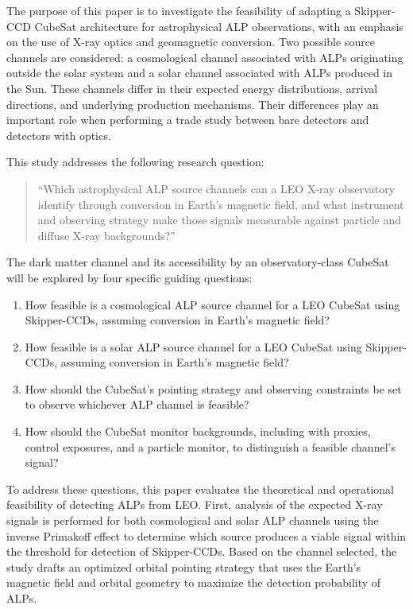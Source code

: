 \documentclass[10pt,letterpaper,twocolumn]{article}
\begin{document}
The purpose of this paper is to investigate the feasibility of adapting a Skipper-CCD CubeSat architecture for astrophysical ALP observations, with an emphasis on the use of X-ray optics and geomagnetic conversion. Two possible source channels are considered: a cosmological channel associated with ALPs originating outside the solar system and a solar channel associated with ALPs produced in the Sun. These channels differ in their expected energy distributions, arrival directions, and underlying production mechanisms. Their differences play an important role when performing a trade study between bare detectors and detectors with optics.  

This study addresses the following research question:

\begin{quote}
``Which astrophysical ALP source channels can a LEO X-ray observatory identify through conversion in Earth's magnetic field, and what instrument and observing strategy make those signals measurable against particle and diffuse X-ray backgrounds?''
\end{quote}

 The dark matter channel and its accessibility by an observatory-class CubeSat will be explored by four specific guiding questions:

\begin{enumerate}
  \item How feasible is a cosmological ALP source channel for a LEO CubeSat using Skipper-CCDs, assuming conversion in Earth's magnetic field?
  \item How feasible is a solar ALP source channel for a LEO CubeSat using Skipper-CCDs, assuming conversion in Earth's magnetic field?
  \item How should the CubeSat's pointing strategy and observing constraints be set to observe whichever ALP channel is feasible?
  \item How should the CubeSat monitor backgrounds, including with proxies, control exposures, and a particle monitor, to distinguish a feasible channel's signal?
\end{enumerate}

To address these questions, this paper evaluates the theoretical and operational feasibility of detecting ALPs from LEO. First, analysis of the expected X-ray signals is performed for both cosmological and solar ALP channels using the inverse Primakoff effect to determine which source produces a viable signal within the threshold for detection of Skipper-CCDs. Based on the channel selected, the study drafts an optimized orbital pointing strategy that uses the Earth's magnetic field  and orbital geometry to maximize the detection probability of ALPs. 
\end{document}
